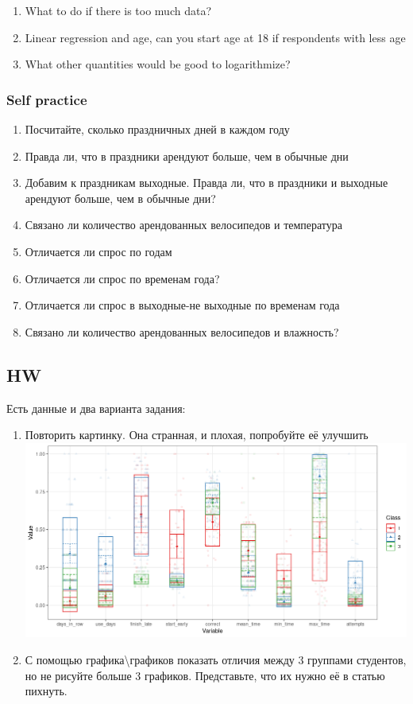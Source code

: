 \documentclass[
]{article}
\providecommand{\tightlist}{%
  \setlength{\itemsep}{0pt}\setlength{\parskip}{0pt}}
\begin{document}
\begin{enumerate}
\def\labelenumi{\arabic{enumi}.}
\tightlist
\item
  What to do if there is too much data?
\item
  Linear regression and age, can you start age at 18 if respondents with
  less age
\item
  What other quantities would be good to logarithmize?
\end{enumerate}

\hypertarget{self-practice}{%
\subsubsection{Self practice}\label{self-practice}}

\begin{enumerate}
\def\labelenumi{\arabic{enumi}.}
\tightlist
\item
  Посчитайте, сколько праздничных дней в каждом году
\item
  Правда ли, что в праздники арендуют больше, чем в обычные дни
\item
  Добавим к праздникам выходные. Правда ли, что в праздники и выходные
  арендуют больше, чем в обычные дни?
\item
  Связано ли количество арендованных велосипедов и температура
\item
  Отличается ли спрос по годам
\item
  Отличается ли спрос по временам года?
\item
  Отличается ли спрос в выходные-не выходные по временам года
\item
  Связано ли количество арендованных велосипедов и влажность?
\end{enumerate}

\hypertarget{hw}{%
\subsection{HW}\label{hw}}

Есть данные и два варианта задания:

\begin{enumerate}
\def\labelenumi{\arabic{enumi}.}
\tightlist
\item
  Повторить картинку. Она странная, и плохая, попробуйте её
  улучшить\includegraphics{data/LPA.png}
\item
  С помощью графика\textbackslash графиков показать отличия между 3
  группами студентов, но не рисуйте больше 3 графиков. Представьте, что
  их нужно её в статью пихнуть.
\end{enumerate}
\end{document}
